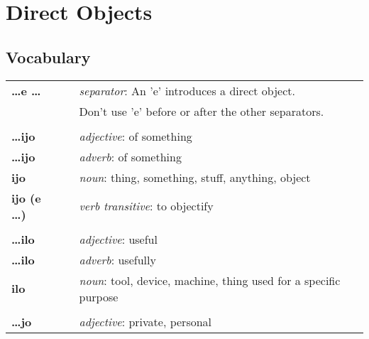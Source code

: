 
\section{Direct Objects}
\subsection*{Vocabulary}

\begin{supertabular}{p{2,5cm}|ll}
    \textbf{\dots e \dots}    &  & \textit{separator}: An 'e' introduces a direct object.                                  \\ && Don't use 'e' before or after the other separators. \\
                              &  &                                                                                         \\
    \textbf{\dots ijo}        &  & \textit{adjective}: of something                                                        \\
    \textbf{\dots ijo}        &  & \textit{adverb}: of something                                                           \\
    \textbf{ijo}              &  & \textit{noun}: thing, something, stuff, anything, object                                \\
    \textbf{ijo (e \dots)}    &  & \textit{verb transitive}: to objectify                                                  \\
                              &  &                                                                                         \\
    \textbf{\dots ilo}        &  & \textit{adjective}: useful                                                              \\
    \textbf{\dots ilo}        &  & \textit{adverb}: usefully                                                               \\
    \textbf{ilo}              &  & \textit{noun}: tool, device, machine, thing used for a specific purpose                 \\
                              &  &                                                                                         \\
    \textbf{\dots jo}         &  & \textit{adjective}: private, personal                                                   \\

\end{supertabular}

